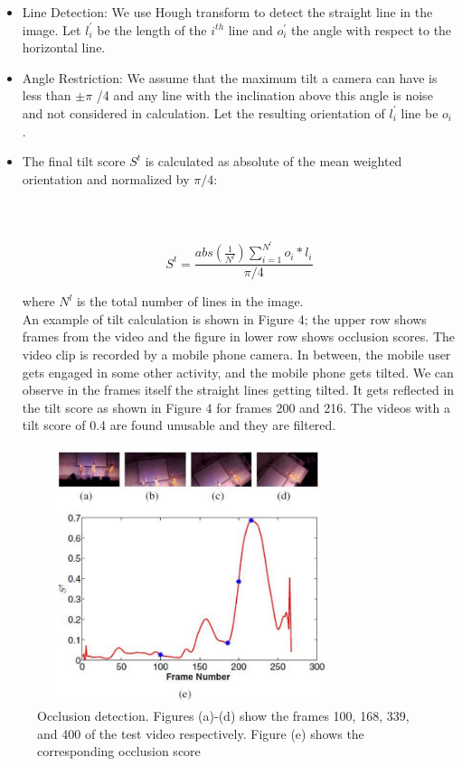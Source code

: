 \documentclass{sig-alternate}
\begin{document}
\begin{itemize}
    \item  Line Detection: We use Hough transform to detect the straight
line in the image. Let $l^'_i$ be the length of the $i^{th}$ line and $o_i^'$ the angle with respect to the horizontal line.



\item  Angle Restriction: We assume that the maximum tilt a camera can have is less than $±\pi$ /4 and any line with the inclination above this angle is noise and not considered in calculation. Let the resulting orientation of $l^'_i$ line be $o_i$ . 


\item  The final tilt score $S^t$ is calculated as absolute of the mean
weighted orientation and normalized by $\pi/4$:\\\\\\\\

$$S^t=\frac{ abs(\frac{1}{N^l}) \sum_{i=1}^{N^l} o_i*l_i}{\pi/4}$$

where $N^l$ is the total number of lines in the image.\\

An example of tilt calculation is shown in Figure 4; the upper
row shows frames from the video and the figure in lower row shows
occlusion scores. The video clip is recorded by a mobile phone
camera. In between, the mobile user gets engaged in some other
activity, and the mobile phone gets tilted. We can observe in the
frames itself the straight lines getting tilted. It gets reflected in the
tilt score as shown in Figure 4 for frames 200 and 216. The videos
with a tilt score of 0.4 are found unusable and they are filtered.


\end{itemize}

\begin{figure}[h!]

  \includegraphics[width=9cm, height=7.5cm]{video_2.pdf}
\caption{ Occlusion detection. Figures (a)-(d) show the frames
100, 168, 339, and 400 of the test video respectively. Figure (e)
shows the corresponding occlusion score}
\end{figure}
\end{document}
